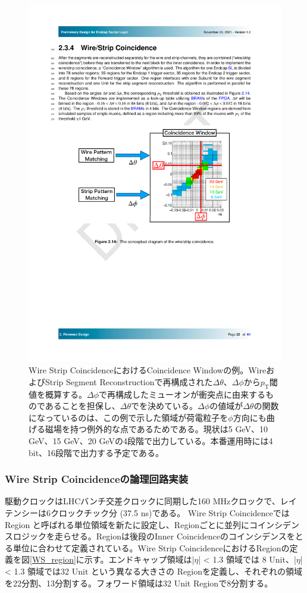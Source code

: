 \begin{figure} 
\centering
\includegraphics[width=16cm]{fig/SL/Concept_WS.pdf}
\caption[Wire Strip CoincidenceにおけるCoincidence Windowの例]{Wire Strip CoincidenceにおけるCoincidence Windowの例\cite{SLPDR}。WireおよびStrip Segment Reconstructionで再構成された$\Delta\theta$、$\Delta\phi$から$p_\mathrm{T}$閾値を概算する。$\Delta\phi$で再構成したミューオンが衝突点に由来するものであることを担保し、$\Delta\theta$で\pt を決めている。$\Delta\phi$の値域が$\Delta\theta$の関数になっているのは、この例で示した領域が荷電粒子を$\phi$方向にも曲げる磁場を持つ例外的な点であるためである。現状\pt は5 GeV、10 GeV、15 GeV、20 GeVの4段階で出力している。本番運用時には4 bit、16段階で出力する予定である。}
\label{Concept_WS}
\end{figure}

\subsubsection*{Wire Strip Coincidenceの論理回路実装}
駆動クロックはLHCバンチ交差クロックに同期した160 MHzクロックで、レイテンシーは6クロックチック分 (37.5 ns)である。
Wire Strip Coincidenceでは Region と呼ばれる単位領域を新たに設定し、Regionごとに並列にコインシデンスロジックを走らせる。Regionは後段のInner Coincidenceのコインシデンスをとる単位に合わせて定義されている。Wire Strip CoincidenceにおけるRegionの定義を図\ref{WS_region}に示す。エンドキャップ領域は|$\eta$| < 1.3 領域では 8 Unit、|$\eta$| < 1.3 領域では32 Unit という異なる大きさの Regionを定義し、それぞれの領域を22分割、13分割する。フォワード領域は32 Unit Regionで8分割する。

